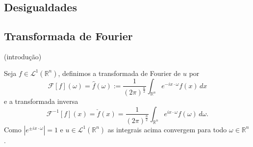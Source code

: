 \documentclass[a4paper, 11pt]{book}
\theoremstyle{definition}
\newcommand{\bN}{\mathbb{N}}
\newcommand{\bR}{\mathbb{R}}
\newcommand{\cF}{\mathcal{F}}
\newcommand{\cL}{\mathcal{L}}
\newcommand{\cW}{\mathcal{W}}
\begin{document}


\subsection{Desigualdades}
\subsection{Transformada de Fourier}

(introdução)

\begin{dbox}
    Seja $f \in \cL^1(\bR^n)$, definimos a transformada de Fourier de $u$ por
    \[
        \cF[f](\omega) = \hat f(\omega) := \frac{1}{(2\pi)^{\frac{n}{2}}} \int_{\bR^n} e^{-i x \cdot \omega} f(x) \,dx
    \]
    e a transformada inversa
    \[
        \cF^{-1}[f](x) =  \check f(x) = \frac{1}{(2\pi)^{\frac{n}{2}}} \int_{\bR^n} e^{i x \cdot \omega} f(\omega) \,d\omega.
    \]
    Como $|e^{\pm ix \cdot \omega}| = 1$ e $u \in \cL^1(\bR^n)$ as integrais acima convergem para todo $\omega \in \bR^n$.
\end{dbox}
\end{document}
